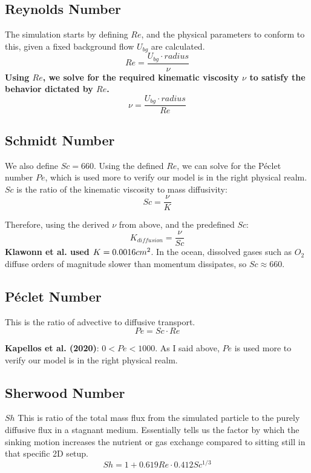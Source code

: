 \documentclass{article}
\begin{document}
\subsection{Reynolds Number}
The simulation starts by defining $Re$, and the physical parameters to conform to this, given a fixed background flow $U_{bg}$ are calculated. 
\begin{equation}
    Re = \frac{U_{bg} \cdot radius}{\nu}
\end{equation}
\textbf{Using $Re$, we solve for the required kinematic viscosity $\nu$ to satisfy the behavior dictated by $Re$.}
\begin{equation}
    \nu = \frac{U_{bg} \cdot radius}{Re}
\end{equation}

\subsection{Schmidt Number}
We also define $Sc=660$. Using the defined $Re$, we can solve for the Péclet number $Pe$, which is used more to verify our model is in the right physical realm. $Sc$ is the ratio of the kinematic viscosity to mass diffusivity:
\begin{equation}
    Sc = \frac{\nu}{K}
\end{equation}

Therefore, using the derived $\nu$ from above, and the predefined $Sc$:
\begin{equation}
    K_{diffusion} = \frac{\nu}{Sc}
\end{equation}
\textbf{Klawonn et al. used $K=0.0016 \space cm^2$}. In the ocean, dissolved gases such as $O_2$ diffuse orders of magnitude slower than momentum dissipates, so \textbf{$Sc \approx 660$}. 

\subsection{Péclet Number}
This is the ratio of advective to diffusive transport. 
\begin{equation}
Pe=Sc \cdot Re    
\end{equation}

\textbf{Kapellos et al. (2020)}: $0<Pe<1000$. As I said above, $Pe$ is used more to verify our model is in the right physical realm.

\subsection{Sherwood Number}
$Sh$ This is ratio of the total mass flux from the simulated particle to the purely diffusive flux in a stagnant medium. Essentially tells us the factor by which the sinking motion increases the nutrient or gas exchange compared to sitting still in that specific 2D setup.
\begin{equation}
Sh = 1 + 0.619Re \cdot 0.412 Sc ^{1/3}    
\end{equation}
\end{document}
